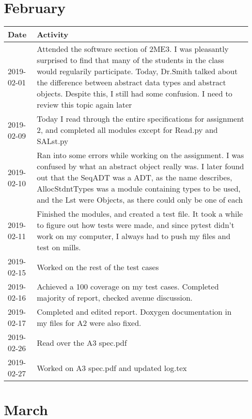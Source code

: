 \documentclass[12pt]{article}
\begin{document}
\section{February}


 \begin{tabular}{|p{2cm}| p{12cm}|} 
 \hline
 Date & Activity  \\ 
 \hline
   2019-02-01 & Attended the software section of 2ME3. I was pleasantly surprised to find that many of the students in the class would regularily participate. Today, Dr.Smith talked about the difference between abstract data types and abstract objects. Despite this, I still had some confusion. I need to review this topic again later \\
 \hline
   2019-02-09 & Today I read through the entire specifications for assignment 2, and completed all modules except for Read.py and SALst.py \\
 \hline
    2019-02-10 & Ran into some errors while working on the assignment. I was confused by what an abstract object really was. I later found out that the SeqADT was a ADT, as the name describes, AllocStdntTypes was a module containing types to be used, and the Lst were Objects, as there could only be one of each \\
 \hline
   2019-02-11 & Finished the modules, and created a test file. It took a while to figure out how tests were made, and since pytest didn't work on my computer, I always had to push my files and test on mills. \\
 \hline
    2019-02-15 & Worked on the rest of the test cases \\
 \hline
    2019-02-16 & Achieved a 100 coverage on my test cases. Completed majority of report, checked avenue discussion.\\
 \hline
     2019-02-17 & Completed and edited report. Doxygen documentation in my files for A2 were also fixed. \\
 \hline
      2019-02-26 & Read over the A3 spec.pdf  \\
 \hline
       2019-02-27 & Worked on A3 spec.pdf and updated log.tex  \\
 \hline

 	
\end{tabular}

\section{March}
\end{document}
